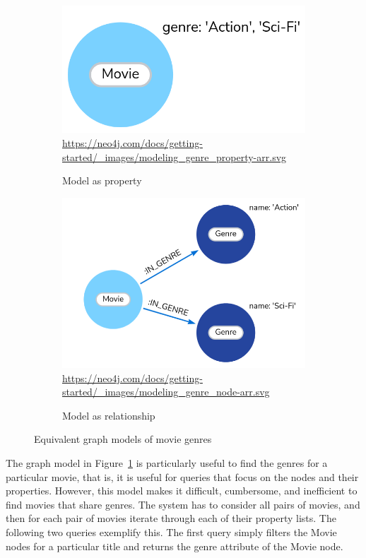 \begin{figure}
\centering
\begin{subfigure}{0.48\textwidth}
    \includegraphics[width=.95\textwidth]{screen5.png}
    \scriptsize{\url{https://neo4j.com/docs/getting-started/\_images/modeling\_genre\_property-arr.svg}}
    \caption{Model as property}
    \label{fig:propertymodel}
\end{subfigure}
\hfill
\begin{subfigure}{0.48\textwidth}
    \includegraphics[width=.95\textwidth]{screen6.png}
    \scriptsize{\url{https://neo4j.com/docs/getting-started/\_images/modeling\_genre\_node-arr.svg}}
    \caption{Model as relationship}
    \label{fig:relationshipmodel}
\end{subfigure}
\hfill
\caption{Equivalent graph models of movie genres}
\label{fig:equivalentmodels}
\end{figure}

The graph model in Figure~\ref{fig:propertymodel} is particularly useful to find the genres for a particular movie, that is, it is useful for queries that focus on the nodes and their properties. However, this model makes it difficult, cumbersome, and inefficient to find movies that share genres. The system has to consider all pairs of movies, and then for each pair of movies iterate through each of their property lists. The following two queries exemplify this. The first query simply filters the Movie nodes for a particular title and returns the genre attribute of the Movie node. 

